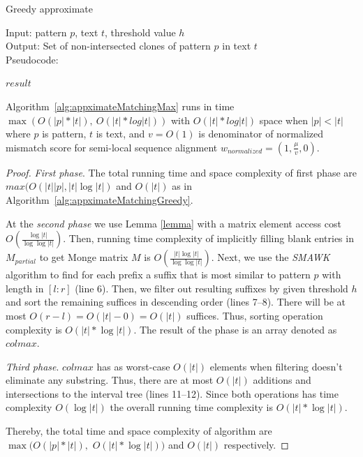 \begin{algorithm}[!t]
\caption{Greedy approximate}
\label{alg:appximateMatchingMax}
Input: pattern $p$, text $t$, threshold value $h$\\
Output: Set of non-intersected clones of pattern $p$ in text $t$\\
Pseudocode:
\begin{algorithmic}[1]

\ENDIF
\ENDFOR
{}
\RETURN $result$
\end{algorithmic}
\end{algorithm}

\begin{theorem}
Algorithm~\ref{alg:appximateMatchingMax} runs in time $\max (O(|p|*|t|),\ O(|t| * log |t|))$ with $O(|t| * log |t|)$ space when $|p|<|t|$ where $p$ is pattern, $t$ is text, and $v=O(1)$ is denominator of normalized mismatch score for semi-local sequence alignment $w_{normalized} = (1,\frac{\mu}{v},0)$.
\end{theorem}
\begin{proof}
\emph{First phase}.
The total running time and space complexity of first phase are $max(O(|t||p|, |t| \log |t|)$ and $O(|t|)$ as in Algorithm~\ref{alg:appximateMatchingGreedy}.

At the \emph{second phase} we use Lemma \ref{lemma} with a matrix element access cost $O(\frac{\log |t|}{\log \log |t|})$.
Then, running time complexity of implicitly filling blank entries in $M_{partial}$ to get Monge matrix $M$ is $O(\frac{|t| \log |t|}{\log \log |t|})$.
Next, we use the \emph{SMAWK} algorithm to find for each prefix a suffix that is most similar to pattern $p$ with length in $[l:r]$ (line 6).
Then, we filter out resulting suffixes by given threshold $h$ and sort the remaining suffices in descending order (lines 7--8).
There will be at most $O(r-l)=O(|t| - 0) = O(|t|)$ suffices.
Thus, sorting operation complexity is $O(|t| * \log |t|)$.
The result of the phase is an array denoted as $colmax$.

\emph{Third phase}.
$colmax$ has as worst-case $O(|t|)$ elements when filtering doesn't eliminate any substring.
Thus, there are at most $O(|t|)$ additions and intersections to the interval tree (lines 11--12).
Since both operations has time complexity $O(\log |t|)$ the overall running time complexity is $O(|t|*\log |t|)$.

Thereby, the total time and space complexity of algorithm are $\max (O(|p|*|t|),$ $O(|t|* \log |t| ))$ and $O(|t|)$ respectively.
\end{proof}

